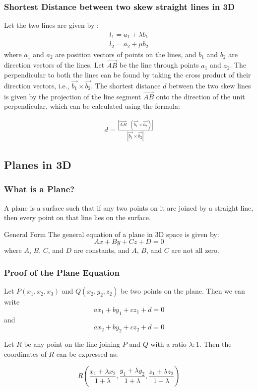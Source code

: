 \begin{frame}
    \frametitle{Shortest Distance between two skew straight lines in 3D}

    Let the two lines are given by :
    \begin{align*}
    l_{1} = a_{1} + \lambda b_{1} \\
    l_{2} = a_{2} + \mu b_{2}   
    \end{align*}
    where \(a_{1}\) and \(a_{2}\) are position vectors of points on the lines, and \(b_{1}\) and \(b_{2}\) are direction vectors of the lines. Let \(\vec{AB}\) be the line through points \(a_{1}\) and \(a_{2}\). The perpendicular to both the lines can be found by taking the cross product of their direction vectors, i.e., \(\vec{b_{1}} \times \vec{b_{2}}\). The shortest distance \(d\) between the two skew lines is given by the projection of the line segment \(\vec{AB}\) onto the direction of the unit perpendicular, which can be calculated using the formula:

    \begin{align*}
    d = \frac{|\vec{AB} \cdot (\vec{b_{1}} \times \vec{b_{2}})|}{|\vec{b_{1}} \times \vec{b_{2}}|}
    \end{align*}

\end{frame}



\subsection{Planes in 3D}

\begin{frame}
    \frametitle{What is a Plane?}
    A plane is a surface such that if any two points on it are joined by a straight line, then every point on that line lies on the surface.
    \begin{block}{General Form}
        The general equation of a plane in 3D space is given by:
        \[
        Ax + By + Cz + D = 0
        \]
        where \(A\), \(B\), \(C\), and \(D\) are constants, and \(A\), \(B\), and \(C\) are not all zero.
    \end{block}
\end{frame}

\begin{frame}
    \frametitle{Proof of the Plane Equation}
    Let \(P(x_{1},x_{2},x_{3}) \) and \(Q(x_{2},y_{2},z_{2})\) be two points on the plane. Then we can write 
    \[
    ax_{1} + by_{1} + cz_{1} + d = 0
    \]
    and
    \[
    ax_{2} + by_{2} + cz_{2} + d = 0
    \]

    Let \(R\) be any point on the line joining \(P\) and \(Q\) with a ratio \(\lambda : 1\). Then the coordinates of \(R\) can be expressed as: 

    \[R\left(\frac{x_{1} + \lambda x_{2}}{1+\lambda}, \frac{y_{1} + \lambda y_{2}}{1+\lambda}, \frac{z_{1} + \lambda z_{2}}{1+\lambda}\right)\]
\end{frame} 

